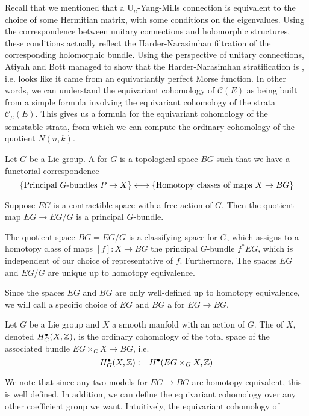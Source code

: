 Recall that we mentioned that a $\mathrm{U}_n$-Yang-Mills connection is
equivalent to the choice of some Hermitian matrix, with some conditions
on the eigenvalues. Using the correspondence between unitary connections
and holomorphic structures, these conditions actually reflect the
Harder-Narasimhan filtration of the corresponding holomorphic bundle.
Using the perspective of unitary connections, Atiyah and Bott managed to show that
the Harder-Narasimhan stratification is ,
i.e. looks like it came from an equivariantly perfect Morse function. In
other words, we can understand the equivariant cohomology of $\mathscr{C}(E)$
as being built from a simple formula involving the equivariant cohomology
of the strata $\mathscr{C}_\mu(E)$. This gives us a formula
for the equivariant cohomology of the semistable strata, from which
we can compute the ordinary cohomology of the quotient $N(n,k)$.
%
\begin{defn}
Let $G$ be a Lie group. A  for $G$ is a topological
space $BG$ such that we have a functorial correspondence
\[
\left\lbrace \text{Principal }G\text{-bundles } P \to X \right\rbrace \longleftrightarrow
\left\lbrace \text{Homotopy classes of maps }X \to BG \right\rbrace
\]
\end{defn}
%
Suppose $EG$ is a contractible space with a free action of $G$. Then the quotient
map $EG \to EG/G$ is a principal $G$-bundle.
%
\begin{thm}
The quotient space $BG = EG/G$ is a classifying space for $G$, which assigns to
a homotopy class of maps $[f] : X \to BG$ the principal $G$-bundle $f^*EG$,
which is independent of our choice of representative of $f$. Furthermore,
The spaces $EG$ and $EG/G$ are unique up to homotopy equivalence.
\end{thm}
%
Since the spaces $EG$ and $BG$ are only well-defined up to homotopy equivalence,
we will call a specific choice of $EG$ and $BG$ a  for $EG \to BG$.
%
\begin{defn}
Let $G$ be a Lie group and $X$ a smooth manfold with an action of $G$. The
 of $X$, denoted $H^\bullet_G(X,\mathbb{Z})$, is the
ordinary cohomology of the total space of the associated bundle
$EG\times_G X \to BG$, i.e.
\[
H^\bullet_G(X,\mathbb{Z}) \vcentcolon= H^\bullet(EG\times_G X,\mathbb{Z})
\]
\end{defn}
%
We note that since any two models for $EG \to BG$ are homotopy equivalent,
this is well defined. In addition, we can define the equivariant cohomology over
any other coefficient group we want. Intuitively, the equivariant cohomology of
